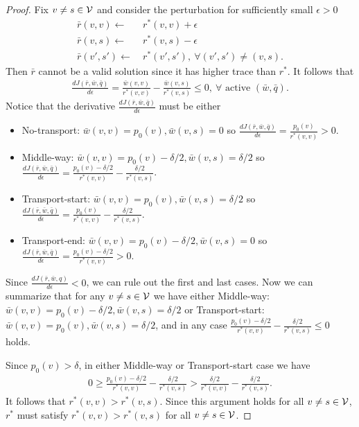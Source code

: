 \begin{proof}
Fix $v \neq s \in \mathcal{V}$ and consider the perturbation for sufficiently small $\epsilon > 0$
\begin{align*}
    \bar r(v,v) \leftarrow &~  r^*(v,v) + \epsilon\\
    \bar r(v,s) \leftarrow &~  r^*(v,s) - \epsilon\\
    \bar r(v',s') \leftarrow &~  r^*(v',s'), ~\forall (v',s') \neq (v,s).
\end{align*}
Then $\bar{r}$ cannot be a valid solution since it has higher trace than $r^*$. It follows that
\begin{align*}
    \frac{d J(\bar r,\bar w,\bar q)}{d\epsilon} = \frac{\bar w(v,v)}{r^*(v,v)} - \frac{\bar w(v,s)}{r^*(v,s)} \leq 0, ~\forall \text{ active } (\bar w,\bar q).
\end{align*}
Notice that the derivative $\frac{d J(\bar r, \bar w,\bar q)}{d\epsilon}$ must be either 
\begin{itemize}
    \item No-transport: $\bar w(v,v) = p_0(v), \bar w(v,s) = 0$ so $\frac{d J(\bar r, \bar w,\bar q)}{d\epsilon} = \frac{p_0(v)}{r^*(v,v)} > 0$.
    \item Middle-way: $\bar w(v,v) = p_0(v) - \delta/2, \bar w(v,s) = \delta/2$ so $\frac{d J(\bar r, \bar w,\bar q)}{d\epsilon} = \frac{p_0(v) - \delta/2}{r^*(v,v)} - \frac{\delta/2}{r^*(v,s)}$.
    \item Transport-start: $\bar w(v,v) = p_0(v), \bar w(v,s) = \delta/2$ so $\frac{d J(\bar r, \bar w,\bar q)}{d\epsilon} = \frac{p_0(v)}{r^*(v,v)} - \frac{\delta/2}{r^*(v,s)}$.
    \item Transport-end: $\bar w(v,v) = p_0(v) - \delta/2, \bar w(v,s) = 0$ so $\frac{d J(\bar r, \bar w,\bar q)}{d\epsilon} = \frac{p_0(v) - \delta/2}{r^*(v,v)} > 0$.
\end{itemize}
Since $\frac{d J(\bar r, \bar w,q)}{d\epsilon} < 0$, we can rule out the first and last cases. Now we can summarize that for any $v \neq s \in \mathcal{V}$ we have either Middle-way: $\bar w(v,v) = p_0(v) - \delta/2, \bar w(v,s) = \delta/2$ or Transport-start: $\bar w(v,v) = p_0(v), \bar w(v,s) = \delta/2$, and in any case $\frac{p_0(v) - \delta/2}{r^*(v,v)}  - \frac{\delta/2}{r^*(v,s)} \leq 0$ holds.

Since $p_0(v) > \delta$, in either Middle-way or Transport-start case we have
\begin{align*}
    0 \geq \frac{p_0(v) - \delta/2}{r^*(v,v)} - \frac{\delta/2}{r^*(v,s)} > \frac{\delta/2}{r^*(v,v)} - \frac{\delta/2}{r^*(v,s)}.
\end{align*}
It follows that $r^*(v,v) > r^*(v,s)$. Since this argument holds for all $v \neq s \in \mathcal{V}$, $r^*$ must satisfy $r^*(v,v) > r^*(v,s)$ for all $v \neq s \in \mathcal{V}$. 


\end{proof}
